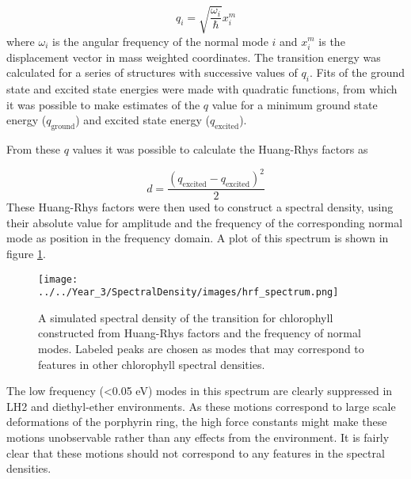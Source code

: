 \begin{equation}
    q_i = \sqrt{\frac{\omega_i}{\hbar}} x^m_i
\end{equation}
%
where $\omega_i$ is the angular frequency of the normal mode $i$ and $x^m_i$ is
the displacement vector in mass weighted coordinates. The \Qy transition energy 
was calculated for a series of structures with successive values of $q_i$. Fits 
of the ground state and excited state energies were made with quadratic functions,
from which it was possible to make estimates of the $q$ value for a minimum ground
state energy ($q_{\text{ground}}$) and excited state energy ($q_{\text{excited}}$).

From these $q$ values it was possible to calculate the Huang-Rhys factors as

\begin{equation}
    d = \frac{\left(q_{\text{excited}} - q_{\text{excited}}\right)^2}{2}
\end{equation}
%
These Huang-Rhys factors were then used to construct a spectral density, using
their absolute value for amplitude and the frequency of the corresponding normal
mode as position in the frequency domain. A plot of this spectrum is shown in figure 
\ref{fig:specdens_hrf}.

\begin{figure}
    \centering
    \texttt{[image: ../../Year\_3/SpectralDensity/images/hrf\_spectrum.png]}
    \caption{A simulated spectral density of the \Qy transition for chlorophyll 
    constructed from Huang-Rhys factors and the frequency of normal modes. Labeled
    peaks are chosen as modes that may correspond to features in other chlorophyll
    spectral densities.}
    \label{fig:specdens_hrf}
\end{figure}

The low frequency (<0.05 eV) modes in this spectrum are clearly suppressed in LH2
and diethyl-ether environments. As these motions correspond to large scale deformations 
of the porphyrin ring, the high force constants might make these motions unobservable
rather than any effects from the environment. It is fairly clear that these motions
should not correspond to any features in the spectral densities.

